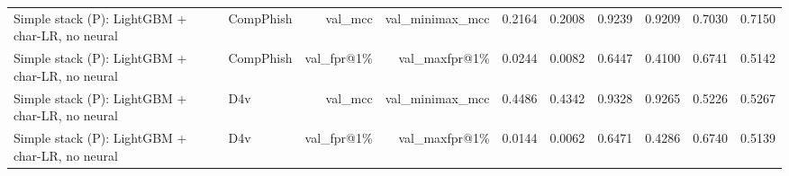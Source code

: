 \begin{table}[t]
\begin{tabular}{llrrrrrrrr}
Simple stack (P): LightGBM + char-LR, no neural & CompPhish & val\_mcc & val\_minimax\_mcc & 0.2164 & 0.2008 & 0.9239 & 0.9209 & 0.7030 & 0.7150 \\
Simple stack (P): LightGBM + char-LR, no neural & CompPhish & val\_fpr@1\% & val\_maxfpr@1\% & 0.0244 & 0.0082 & 0.6447 & 0.4100 & 0.6741 & 0.5142 \\
Simple stack (P): LightGBM + char-LR, no neural & D4v & val\_mcc & val\_minimax\_mcc & 0.4486 & 0.4342 & 0.9328 & 0.9265 & 0.5226 & 0.5267 \\
Simple stack (P): LightGBM + char-LR, no neural & D4v & val\_fpr@1\% & val\_maxfpr@1\% & 0.0144 & 0.0062 & 0.6471 & 0.4286 & 0.6740 & 0.5139 \\
\bottomrule
\end{tabular}
\end{table}